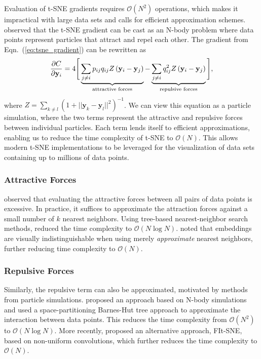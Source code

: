 \documentclass[article]{jss}
\begin{document}
Evaluation of t-SNE gradients requires $\mathcal{O}(N^2)$ operations,
which makes it impractical with large data sets and
calls for efficient approximation schemes.
\citet{van2014accelerating} observed that the t-SNE gradient can be cast as an
N-body problem where data points represent particles that attract and repel each
other. The gradient from Eqn.~(\ref{eq:tsne_gradient}) can be rewritten as
\begin{equation}
\frac{\partial C}{\partial \mathbf{y}_i} = 4 \Bigg [
\underbrace{\sum_{j \neq i} p_{ij} q_{ij} Z \left ( \mathbf{y}_i - \mathbf{y}_j \right )}_{\text{attractive forces}}  -
\underbrace{\sum_{j \neq i} q_{ij}^2 Z \left ( \mathbf{y}_i - \mathbf{y}_j \right )}_{\text{repulsive forces}}
\Bigg ], \label{eq:grad_attr_rep} \notag
\end{equation}
where $Z = \sum_{k \neq l}\left ( 1 + || \mathbf{y}_k - \mathbf{y}_l ||^2 \right
)^{-1}$. We can view this equation as a particle simulation, where the
two terms represent the attractive and repulsive forces between individual
particles. Each term lends itself to efficient approximations, enabling us to
reduce the time complexity of t-SNE to $\mathcal{O}(N)$. This allows modern
t-SNE implementations to be leveraged for the visualization of data sets
containing up to millions of data points.

\subsubsection*{Attractive Forces}
\citet{van2014accelerating} observed that evaluating the attractive forces
between all pairs of data points is excessive. In practice, it 
suffices to approximate the attraction forces against a small number of
$k$ nearest neighbors. Using tree-based nearest-neighbor search methods,
\citet{van2014accelerating} reduced the time complexity to $\mathcal{O}(N \log
N)$. \citet{linderman2019fast} noted that embeddings
are visually indistinguishable when using merely \textit{approximate} nearest
neighbors, further reducing time complexity to $\mathcal{O}(N)$.

\subsubsection*{Repulsive Forces}
Similarly, the repulsive term can also be approximated, motivated by methods from
particle simulations. \citet{van2014accelerating} proposed an approach based on
N-body simulations and used a space-partitioning Barnes-Hut tree approach to
approximate the interaction between data points. This reduces the time
complexity from $\mathcal{O}(N^2)$ to $\mathcal{O}(N \log N)$. More recently,
\citet{linderman2019fast} proposed an alternative approach, FIt-SNE, based on
non-uniform convolutions, which further reduces the time complexity to
$\mathcal{O}(N)$.
\end{document}
